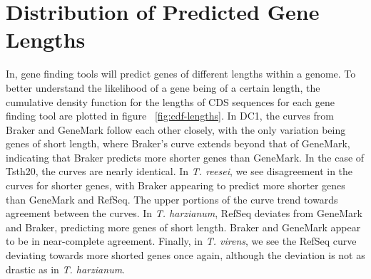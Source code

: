 \section{Distribution of Predicted Gene Lengths}

In, gene finding tools will predict genes of different lengths within
a genome. To better understand the likelihood of a gene being of a
certain length, the cumulative density function for the lengths of CDS
sequences for each gene finding tool are plotted in figure
~\ref{fig:cdf-lengths}. In DC1, the curves from Braker and GeneMark
follow each other closely, with the only variation being genes of
short length, where Braker's curve extends beyond that of GeneMark,
indicating that Braker predicts more shorter genes than GeneMark. In
the case of Tsth20, the curves are nearly identical. In
\textit{T. reesei}, we see disagreement in the curves for shorter
genes, with Braker appearing to predict more shorter genes than
GeneMark and RefSeq. The upper portions of the curve trend towards
agreement between the curves. In \textit{T. harzianum}, RefSeq
deviates from GeneMark and Braker, predicting more genes of short
length. Braker and GeneMark appear to be in near-complete
agreement. Finally, in \textit{T. virens}, we see the RefSeq curve
deviating towards more shorted genes once again, although the
deviation is not as drastic as in \textit{T. harzianum}.


